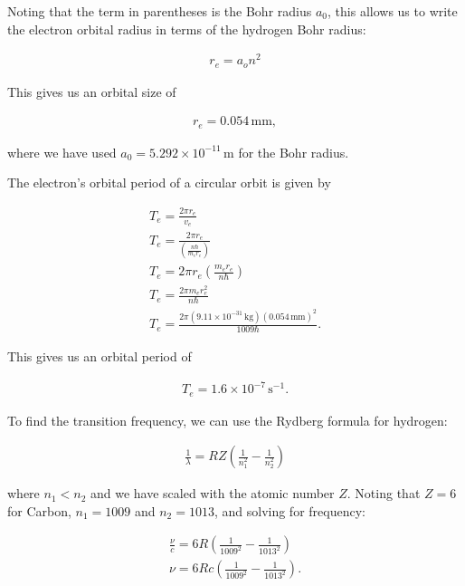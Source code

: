 \documentclass[12pt]{article}
\begin{document}
Noting that the term in parentheses is the Bohr radius $a_0$, this allows us to write the electron orbital radius in terms of the hydrogen Bohr radius:

\begin{align*}
r_e = a_on^2
\end{align*}

This gives us an orbital size of

\begin{align*}
\boxed{ r_e = 0.054\,\mathrm{mm} },
\end{align*}

where we have used $a_0 = 5.292\times10^{-11}\,\mathrm{m}$ for the Bohr radius.

The electron's orbital period of a circular orbit is given by

\begin{equation*}
\begin{split}
T_e = \frac{2\pi r_e}{v_e} \\
T_e = \frac{2\pi r_e}{\left( \frac{n\hbar}{m_er_e} \right)} \\
T_e = 2\pi r_e \left( \frac{m_er_e}{n\hbar} \right) \\
T_e = \frac{2\pi m_er_e^2}{n\hbar} \\
T_e = \frac{2\pi (9.11\times10^{-31}\,\mathrm{kg})(0.054\,\mathrm{mm})^2}{1009\hbar}.
\end{split}
\end{equation*}

This gives us an orbital period of

\begin{align*}
\boxed{ T_e = 1.6\times10^{-7}\,\mathrm{s^{-1}} }.
\end{align*}

To find the transition frequency, we can use the Rydberg formula for hydrogen:

\begin{equation*}
\begin{split}
\frac{1}{\lambda} = RZ \left( \frac{1}{n_1^2} - \frac{1}{n_2^2} \right)
\end{split}
\end{equation*}

where $n_1 < n_2$ and we have scaled with the atomic number $Z$. Noting that $Z=6$ for Carbon, $n_1=1009$ and $n_2=1013$, and solving for frequency:

\begin{equation*}
\begin{split}
\frac{\nu}{c} = 6R \left( \frac{1}{1009^2} - \frac{1}{1013^2} \right) \\
\nu = 6Rc \left( \frac{1}{1009^2} - \frac{1}{1013^2} \right).
\end{split}
\end{equation*}
\end{document}
